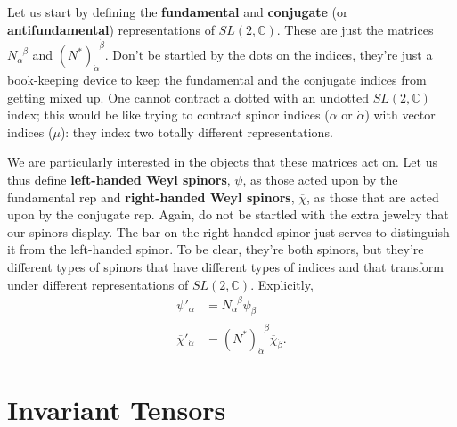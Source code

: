 Let us start by defining the \textbf{fundamental} and \textbf{conjugate} (or \textbf{antifundamental}) representations of $SL(2,\mathbb C)$. These are just the matrices $N_\alpha^{\phantom\alpha\beta}$ and $(N^*)_{\dot\alpha}^{\phantom\alpha\dot\beta}$. Don't be startled by the dots on the indices, they're just a book-keeping device to keep the fundamental and the conjugate indices from getting mixed up. One cannot contract a dotted with an undotted $SL(2,\mathbb C)$ index; this would be like trying to contract spinor indices ($\alpha$ or $\dot\alpha$) with vector indices ($\mu$): they index two totally different representations.

We are particularly interested in the objects that these matrices act on. Let us thus define \textbf{left-handed Weyl spinors}, $\psi$, as those acted upon by the fundamental rep and \textbf{right-handed Weyl spinors}, $\overline\chi$, as those that are acted upon by the conjugate rep. Again, do not be startled with the extra jewelry that our spinors display. The bar on the right-handed spinor just serves to distinguish it from the left-handed spinor. To be clear, they're both spinors, but they're different types of spinors that have different types of indices and that transform under different representations of $SL(2,\mathbb C)$. Explicitly,
\begin{align}
    \psi'_\alpha &= N_\alpha^{\phantom\alpha\beta} \psi_\beta \\
    \overline\chi'_{\dot{\alpha}} &= \left(N^*\right)_{\dot{\alpha}}^{\phantom{\dot{\alpha}}\dot{\beta}}\overline\chi_{\dot{\beta}}.    
\end{align}



\section{Invariant Tensors} %

